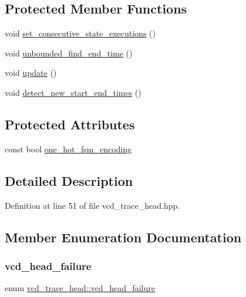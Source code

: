 \subsection*{Protected Member Functions}
\begin{DoxyCompactItemize}
\item 
void \hyperlink{structvcd__trace__head_acdcc6eecd8b483590b6974d51cc9a8fc}{set\+\_\+consecutive\+\_\+state\+\_\+executions} ()
\item 
void \hyperlink{structvcd__trace__head_aefd02e39314983a9e8b2ce299d8482f1}{unbounded\+\_\+find\+\_\+end\+\_\+time} ()
\item 
void \hyperlink{structvcd__trace__head_afebefebabc382bd2bd3d408f852668a8}{update} ()
\item 
void \hyperlink{structvcd__trace__head_ab2ccd52157df2b0a82e47dec7a3942c4}{detect\+\_\+new\+\_\+start\+\_\+end\+\_\+times} ()
\end{DoxyCompactItemize}
\subsection*{Protected Attributes}
\begin{DoxyCompactItemize}
\item 
const bool \hyperlink{structvcd__trace__head_abf2f32f88367884a7424738693ec5fd8}{one\+\_\+hot\+\_\+fsm\+\_\+encoding}
\end{DoxyCompactItemize}


\subsection{Detailed Description}


Definition at line 51 of file vcd\+\_\+trace\+\_\+head.\+hpp.



\subsection{Member Enumeration Documentation}
\mbox{\label{structvcd__trace__head_ad0e9ddff3ce422e4273ae6ccbb2a88f8}} 
\subsubsection{\texorpdfstring{vcd\+\_\+head\+\_\+failure}{vcd\_head\_failure}}
{\footnotesize\ttfamily enum \hyperlink{structvcd__trace__head_ad0e9ddff3ce422e4273ae6ccbb2a88f8}{vcd\+\_\+trace\+\_\+head\+::vcd\+\_\+head\+\_\+failure}}

